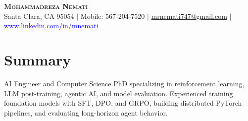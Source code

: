\documentclass[letterpaper,13pt]{article}
\begin{document}
\begin{center}
    \textbf{\LARGE \scshape Mohammadreza Nemati} \\ \vspace{1pt}
    \small Santa Clara, CA 95054 $|$ Mobile: 567-204-7520 $|$
    \href{mailto:mrnemati747@gmail.com}{mrnemati747@gmail.com} $|$
    \href{https://www.linkedin.com/in/mnemati/}{\textcolor{blue}{\underline{www.linkedin.com/in/mnemati}}}
\end{center}

\section{Summary}
\small{AI Engineer and Computer Science PhD specializing in reinforcement learning, LLM post-training, agentic AI, and model evaluation. Experienced training foundation models with SFT, DPO, and GRPO, building distributed PyTorch pipelines, and evaluating long-horizon agent behavior.}
\vspace{0.05cm}
\end{document}
